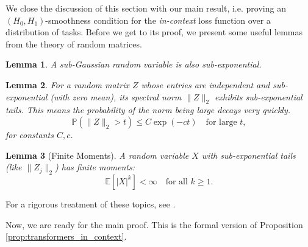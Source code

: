 \documentclass[a4paper,11pt]{article}
\newcommand{\1}{\mathbbm{1}}
\theoremstyle{plain}
\newtheorem{lemma}{Lemma}
\begin{document}
We close the discussion of this section with our main result, i.e. proving an $(H_0,H_1)$-smoothness condition for the \emph{in-context} loss function over a distribution of tasks.
Before we get to its proof, we present some useful lemmas from the theory of random matrices.
\begin{lemma}
\label{le:1}
A sub-Gaussian random variable is also sub-exponential. 
\end{lemma}
\begin{lemma}
\label{le:2}
For a random matrix $Z$ whose entries are independent and sub-exponential (with zero mean), its spectral norm $\|Z\|_2$ exhibits sub-exponential tails. This means the probability of the norm being large decays very quickly.
\begin{equation*}
\mathbb{P}(\|Z\|_2 > t) \leq C \exp(-c t) \quad \text{for large } t,
\end{equation*}
for constants $C, c$.
\end{lemma}
\begin{lemma}[Finite Moments]
\label{le:finite moments}
    A random variable $X$ with sub-exponential tails (like $\|Z_j\|_2$) has finite moments:
$$
\mathbb{E}[|X|^k] < \infty \quad \text{for all } k \geq 1.
$$
\end{lemma}
\noindent For a rigorous treatment of these topics, see \cite{vershynin2018high}.


Now, we are ready for the main proof. This is the formal version of Proposition \ref{prop:transformers_in_context}.
\end{document}
